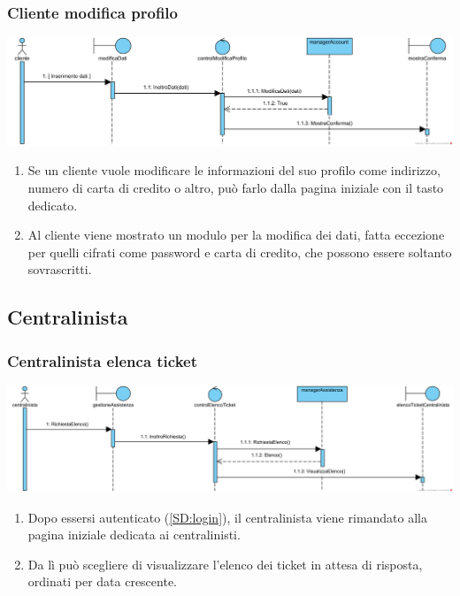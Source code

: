 \documentclass[12pt,a4paper]{article}
\begin{document}
\subsubsection{Cliente modifica profilo}
\label{SD:modificaprofilo}
\begin{center}
\includegraphics[width=\textwidth]{SequenceDiagram/ClienteProfiloModifica}
\end{center}

\begin{enumerate}
\item Se un cliente vuole modificare le informazioni del suo profilo come indirizzo, numero di carta di credito o altro, può farlo dalla pagina iniziale con il tasto dedicato.
\item Al cliente viene mostrato un modulo per la modifica dei dati, fatta eccezione per quelli cifrati come password e carta di credito, che possono essere soltanto sovrascritti.
\end{enumerate}

\newpage

\subsection{Centralinista}
\subsubsection{Centralinista elenca ticket}
\label{SD:centralinistaelencaticket}

\begin{center}
\includegraphics[width=\textwidth]{SequenceDiagram/CentralinistaTicketElenco}
\end{center}

\begin{enumerate}
\item Dopo essersi autenticato (\ref{SD:login}), il centralinista viene rimandato alla pagina iniziale dedicata ai centralinisti. 
\item Da lì può scegliere di visualizzare l'elenco dei ticket in attesa di risposta, ordinati per data crescente.
\end{enumerate}
\end{document}
